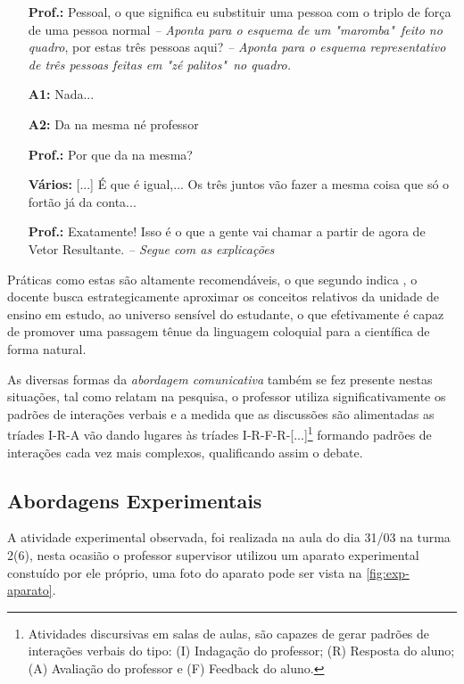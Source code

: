 \begin{center}
	\begin{minipage}{.9\textwidth}
		\begin{itemize}
			\item [\textbf{Prof.:}] Pessoal, o que significa eu substituir uma pessoa com o triplo de força de uma pessoa normal \textit{-- Aponta para o esquema de um "maromba"~feito no quadro}, por estas três pessoas aqui? \textit{-- Aponta para o esquema representativo de três pessoas feitas em "zé palitos"~no quadro.}
			\item [\textbf{A1:}] Nada...
			\item [\textbf{A2:}] Da na mesma né professor
			\item [\textbf{Prof.:}] Por que da na mesma?
			\item [\textbf{Vários:}] [...] É que é igual,... Os três juntos vão fazer a mesma coisa que só o fortão já da conta...
			\item [\textbf{Prof.:}] Exatamente! Isso é o que a gente vai chamar a partir de agora de Vetor Resultante. \textit{-- Segue com as explicações}
		\end{itemize}
	\end{minipage}		
\end{center}
Práticas como estas são altamente recomendáveis, o que segundo indica , o docente busca estrategicamente aproximar os conceitos relativos da unidade de ensino em estudo, ao universo sensível do estudante, o que efetivamente é capaz de promover uma passagem tênue da linguagem coloquial para a científica de forma natural.

As diversas formas da \textit{abordagem comunicativa} também se fez presente nestas situações, tal como relatam  na pesquisa, o professor utiliza significativamente os padrões de interações verbais e a medida que as discussões são alimentadas as tríades I-R-A vão dando lugares às tríades I-R-F-R-[...]\footnote{Atividades discursivas em salas de aulas, são capazes de gerar padrões de interações verbais do tipo: (I) Indagação do professor; (R) Resposta do aluno; (A) Avaliação do professor e (F) Feedback do aluno.} formando padrões de interações cada vez mais complexos, qualificando assim o debate.


\subsection{Abordagens Experimentais} %
\label{sub:Abordagens Experimentais}
A atividade experimental observada, foi realizada na aula do dia 31/03 na turma 2(6), nesta ocasião o professor supervisor utilizou um aparato experimental constuído por ele próprio, uma foto do aparato pode ser vista na \autoref{fig:exp-aparato}.

